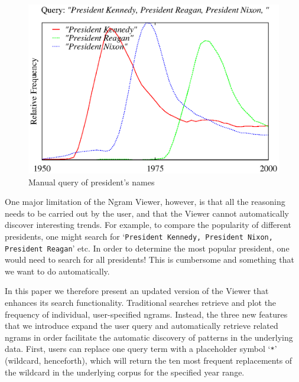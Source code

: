 \documentclass[11pt]{article}
\begin{document}
\begin{figure}
\includegraphics[width=\textwidth]{graphs/kenreanixon}
\caption{\label{fig:manual president} Manual query of president's names}
\end{figure}

One major limitation of the Ngram Viewer, however, is that all the reasoning needs to be carried out by the user, and that the Viewer cannot automatically discover interesting trends. For example, to compare the popularity of different presidents, one might search for `\texttt{President Kennedy, President Nixon, President Reagan}' etc. In order to determine the most popular president, one would need to search for all presidents! This is cumbersome and something that we want to do automatically.

In this paper we therefore present an updated version of the Viewer that enhances its search functionality. Traditional searches retrieve and plot the frequency of individual, user-specified ngrams. Instead, the three new features that we introduce expand the user query and automatically retrieve related ngrams in order facilitate the automatic discovery of patterns in the underlying data. First, users can replace one query term with a placeholder symbol `\texttt{*}' (wildcard, henceforth), which will return the ten most frequent replacements of the wildcard in the underlying corpus for the specified year range. 
\end{document}
